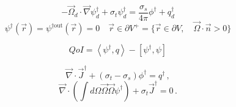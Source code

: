 \documentclass[12pt]{report}
\newcommand{\vr}{\vec{r}}
\newcommand{\vO}{\vec{\Omega}}
\newcommand{\bra}{\left\langle}
\newcommand{\ket}{\right\rangle}
\newcommand{\sbra}{\left[}
\newcommand{\sket}{\right]}
\renewcommand{\div}{\vec{\nabla} \cdot}
\newcommand{\grad}{\vec{\nabla}}
\newcommand{\bound}{\partial V}
\newcommand{\sigt}{\sigma_t}
\newcommand{\sigs}{\sigma_s}
\newcommand{\angSource}{q}
\newcommand{\scalSource}{q}
\newcommand{\angResp}{q^\dag}
\begin{document}
\begin{equation}
\label{snAdjAlt}
- \vO_d \cdot \grad \psi^\dag_d + \sigt \psi^\dag_d = \frac{\sigs}{4 \pi} \phi^\dag + \angResp_d
\end{equation}
%
\begin{equation}
\psi^\dag(\vr) = \psi^{\dag \text{out}}(\vr)=0 \quad \vr \in \partial V^{+} = \{  \vr \in \bound , \quad \vO \cdot \vec{n} > 0 \}
\end{equation}

\begin{equation}
\label{snAdjQoIAlt}
QoI = \bra \psi^\dag , \angSource \ket - \sbra \psi^\dag,  \psi \sket
\end{equation}

\begin{equation}
\label{0am}
\div \vec{J}^\dag + (\sigt-\sigs) \phi^\dag  = \scalSource^\dag  \,,
\end{equation}
%
\begin{equation}
\label{1am}
\div \left(  \int d\Omega \vO \vO \psi^\dag  \right) + \sigt \vec{J}^\dag  = 0 \,.
\end{equation}
%
\end{document}

